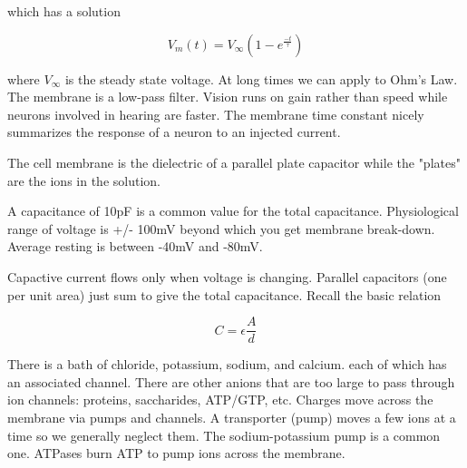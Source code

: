 \documentclass[twoside]{article}
\begin{document}
which has a solution

\begin{equation}
V_{m}(t) = V_{\infty}(1-e^{\frac{-t}{\tau}})
\end{equation}

where $V_{\infty}$ is the steady state voltage. At long times
we can apply to Ohm's Law. The membrane is a low-pass filter. 
Vision runs on gain rather than speed while neurons involved 
in hearing are faster. The membrane time constant nicely 
summarizes the response of a neuron to an injected current.

The cell membrane is the dielectric of a parallel plate 
capacitor while the "plates" are the ions in the solution. 

A capacitance of 10pF is a common value for the total 
capacitance. Physiological range of voltage is +/- 100mV
beyond which you get membrane break-down. Average resting
is between -40mV and -80mV. 

Capactive current flows only when voltage is changing. Parallel 
capacitors (one per unit area) just sum to give the total 
capacitance. Recall the basic relation

\begin{equation}
C = \epsilon\frac{A}{d}
\end{equation}

There is a bath of chloride, potassium, sodium, and calcium. 
each of which has an associated channel. 
There are other anions that are too large to pass through 
ion channels: proteins, saccharides, ATP/GTP, etc. Charges
move across the membrane via pumps and channels. A transporter
(pump) moves a few ions at a time so we generally neglect them.  
The sodium-potassium pump is a common one. ATPases burn ATP
to pump ions across the membrane. 
\end{document}
